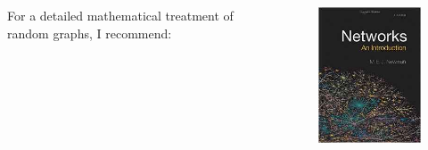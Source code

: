 \documentclass[aspectratio=169]{beamer}
\begin{document}
\begin{frame}

\begin{columns}
\begin{column}{0.6\textwidth}
For a detailed mathematical treatment of random graphs, I recommend:
\end{column}
\begin{column}{0.4\textwidth}
\begin{figure}
\centering
\includegraphics[width=\textwidth]{figures/newman_networks_2010_cover}
\end{figure}
\end{column}
\end{columns}

\end{frame}
\end{document}
